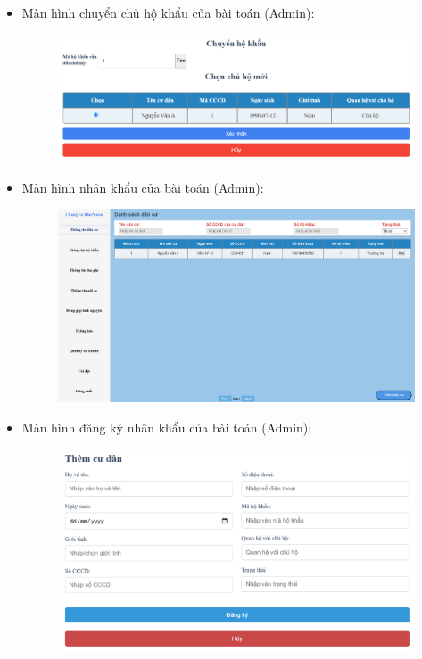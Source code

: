 \documentclass{article}
\begin{document}
\begin{itemize}
\begin{figure}[H]
    \end{figure}
    \item Màn hình chuyển chủ hộ khẩu của bài toán (Admin):
    \begin{figure}[H]
        \centering
        \includegraphics[width=1\textwidth]{Ảnh chương 4/Chuyển chủ hộ 1.png}
    \end{figure}
    \newpage
    \item Màn hình nhân khẩu của bài toán (Admin):
    \begin{figure}[H]
        \centering
        \includegraphics[width=1\textwidth]{Ảnh chương 4/Nhân khẩu 1.png}
    \end{figure}
    \item Màn hình đăng ký nhân khẩu của bài toán (Admin):
    \begin{figure}[H]
        \centering
        \includegraphics[width=1\textwidth]{Ảnh chương 4/Thêm nhân khẩu 1.png}

\end{figure}
\end{itemize}
\end{document}

